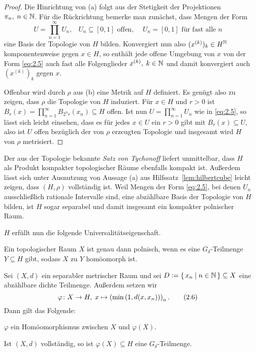\documentclass[../main/main.tex]{subfiles}
\begin{document}
	\begin{proof}
		Die Hinrichtung von (a) folgt aus der Stetigkeit der Projektionen 
		$\pi_n, \; n \in \mathbb{N}$. Für die Rückrichtung bemerke man zunächst, dass Mengen der Form 
		\[U = \prod_{n=1}^{\infty} U_n\text{,} \quad U_n \subseteq [0, 1] \text{ offen, }
		\quad U_n = [0, 1] \text{ für fast alle } n \label{eq:2.5} \tag{2.5}\]
		eine Basis der Topologie von $H$ bilden. 
		Konvergiert nun also $(x^{(k)})_k \in H^{\mathbb{N}}$ komponentenweise gegen $x \in H$, 
		so enthält jede offene Umgebung von $x$ von der Form \eqref{eq:2.5} auch fast 
		alle Folgenglieder $x^{(k)}, \; k \in \mathbb{N}$ und damit konvergiert 
		auch $(x^{(k)})_k$ gegen $x$.
		
		Offenbar wird durch $\rho$ aus (b) eine Metrik auf $H$ definiert. 
		Es genügt also zu zeigen, dass $\rho$ die Topologie von $H$ induziert. 
		Für $x \in H$ und $r > 0$ ist 
		$B_r(x) = \prod_{n=1}^{\infty} B_{2^n r}(x_n) \subseteq H$ 
		offen. Ist nun $U = \prod_{n=1}^{\infty} U_n$ wie in \eqref{eq:2.5}, 
		so lässt sich leicht einsehen, dass es für jedes $x \in U$ ein $r > 0$ 
		gibt mit $B_r(x) \subseteq U$, also ist $U$ offen bezüglich der von $\rho$ 
		erzeugten Topologie und insgesamt wird $H$ von $\rho$ metrisiert.
	\end{proof}
	
	Der aus der Topologie bekannte \emph{Satz von Tychonoff} liefert 
	unmittelbar, dass $H$ als Produkt kompakter topologischer Räume 
	ebenfalls kompakt ist.
	Außerdem lässt sich unter Ausnutzung von Aussage (a) aus 
	Hilfssatz~\ref{lem:hilbertcube} leicht zeigen, dass $(H, \rho)$ 
	vollständig ist. Weil Mengen der Form \eqref{eq:2.5}, bei denen 
	$U_n$ ausschließlich rationale Intervalle sind, eine abzählbare 
	Basis der Topologie von $H$ bilden, ist $H$ sogar separabel und 
	damit insgesamt ein kompakter polnischer Raum.
	
	$H$ erfüllt nun die folgende Universalitätseigenschaft.
	
	\begin{Satz}
		\label{thm:characterizationpolishspaces}
		Ein topologischer Raum $X$ ist genau dann polnisch, 
		wenn es eine $G_\delta$-Teilmenge $Y \subseteq H$ gibt, sodass $X$ 
		zu $Y$ homöomorph ist. 
	\end{Satz}
	
	\begin{Hilfssatz}
		\label{lem:characterizationpolishspaces}
		Sei $(X, d)$ ein separabler metrischer Raum und sei 
		$D \vcentcolon = \left\{\, x_n \; \middle| \; n \in \mathbb{N} \,\right\} \subseteq X$ eine abzählbare 
		dichte Teilmenge. Außerdem setzen wir
		\[\varphi \colon X \to H, \; x \mapsto \left(\min \left(1, d(x, x_n) \right) \right)_n  \text{.} \label{eq:2.6} \tag{2.6}\]
		Dann gilt das Folgende:
		\begin{enumeratethm}
			\item $\varphi$ ein Homöomorphismus zwischen $X$ und $\varphi(X)$.
			\item Ist $(X, d)$ vollständig, so ist $\varphi(X) \subseteq H$ 
			eine $G_\delta$-Teilmenge.
		\end{enumeratethm}
	\end{Hilfssatz}
	
\end{document}
